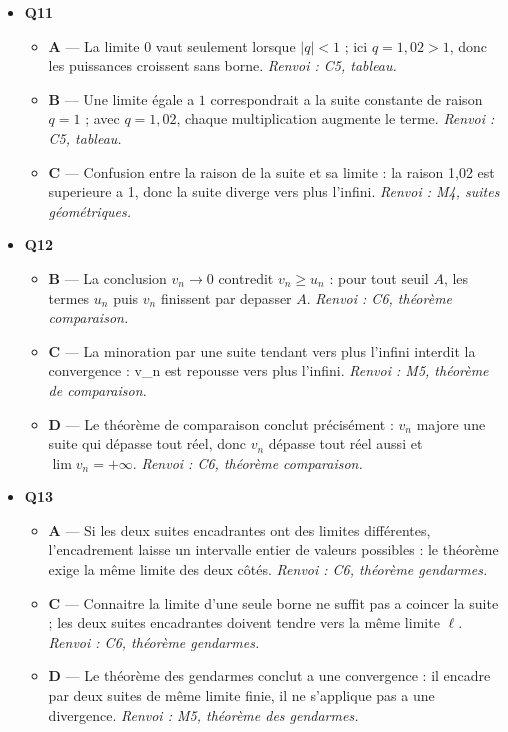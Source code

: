 \begin{itemize}
\begin{itemize}
  \end{itemize}
  \item \textbf{Q11}
  \begin{itemize}
    \item \textbf{A} — La limite $0$ vaut seulement lorsque $|q|<1$ ; ici $q=1{,}02>1$, donc les puissances croissent sans borne. \emph{Renvoi : C5, tableau.}
    \item \textbf{B} — Une limite égale a $1$ correspondrait a la suite constante de raison $q=1$ ; avec $q=1{,}02$, chaque multiplication augmente le terme. \emph{Renvoi : C5, tableau.}
    \item \textbf{C} — Confusion entre la raison de la suite et sa limite : la raison 1,02 est superieure a 1, donc la suite diverge vers plus l'infini. \emph{Renvoi : M4, suites géométriques.}
  \end{itemize}
  \item \textbf{Q12}
  \begin{itemize}
    \item \textbf{B} — La conclusion $v_n\to0$ contredit $v_n\geq u_n$ : pour tout seuil $A$, les termes $u_n$ puis $v_n$ finissent par depasser $A$. \emph{Renvoi : C6, théorème comparaison.}
    \item \textbf{C} — La minoration par une suite tendant vers plus l'infini interdit la convergence : v\_n est repousse vers plus l'infini. \emph{Renvoi : M5, théorème de comparaison.}
    \item \textbf{D} — Le théorème de comparaison conclut précisément : $v_n$ majore une suite qui dépasse tout réel, donc $v_n$ dépasse tout réel aussi et $\lim v_n = +\infty$. \emph{Renvoi : C6, théorème comparaison.}
  \end{itemize}
  \item \textbf{Q13}
  \begin{itemize}
    \item \textbf{A} — Si les deux suites encadrantes ont des limites différentes, l'encadrement laisse un intervalle entier de valeurs possibles : le théorème exige la même limite des deux côtés. \emph{Renvoi : C6, théorème gendarmes.}
    \item \textbf{C} — Connaitre la limite d'une seule borne ne suffit pas a coincer la suite ; les deux suites encadrantes doivent tendre vers la même limite $\ell$. \emph{Renvoi : C6, théorème gendarmes.}
    \item \textbf{D} — Le théorème des gendarmes conclut a une convergence : il encadre par deux suites de même limite finie, il ne s'applique pas a une divergence. \emph{Renvoi : M5, théorème des gendarmes.}

\end{itemize}
\end{itemize}
